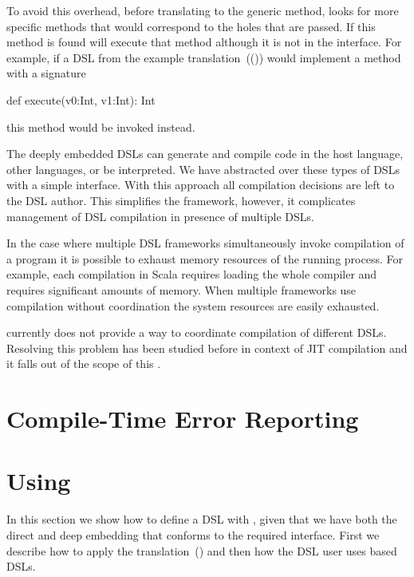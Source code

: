 To avoid this overhead, before translating to the generic  method, \yy looks for
more specific methods that would correspond to the holes that are passed. If this method is found
\yy will execute that method although it is not in the interface. For example, if a DSL from the example
translation~(()) would implement a method with a signature\begin{lstparagraph}
def execute(v0:Int, v1:Int): Int
\end{lstparagraph}
this method would be invoked instead.

The deeply embedded DSLs can generate and compile code in the host language, other languages, or be interpreted. We have
abstracted over these types of DSLs with a simple interface. With this approach
all compilation decisions are left to the DSL author. This simplifies the framework, however, it
complicates management of DSL compilation in presence of multiple DSLs.

In the case where multiple DSL frameworks simultaneously invoke compilation
of a program it is possible to exhaust memory resources of the running process. For example, each
compilation in Scala requires loading the whole compiler and requires significant
amounts of memory. When multiple frameworks use compilation without coordination the
system resources are easily exhausted.

\yy currently does not provide a way to coordinate compilation of different DSLs. Resolving this
 problem has been studied before in context of JIT compilation  and
 it falls out of the scope of this \work.

\section{Compile-Time Error Reporting}
\label{sec:compile-time-error-reporting}

\section{Using \yy}
\label{sec:using-yy}

In this section we show how to define a DSL with \yy, given that we have
 both the direct and deep embedding that conforms to the required interface.
 First we describe how to apply the translation~() and
 then how the DSL user uses \yy based DSLs.

